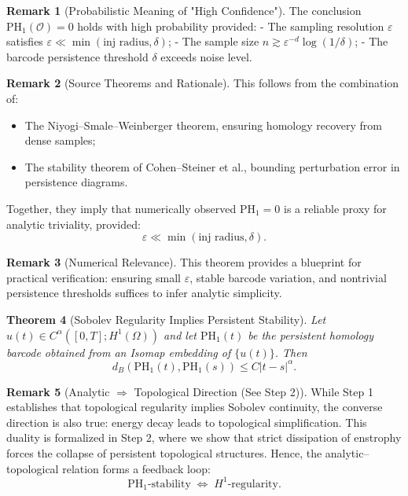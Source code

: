 \documentclass[11pt]{article}
\newtheorem{theorem}{Theorem}[section]
\theoremstyle{definition}
\newtheorem{remark}[theorem]{Remark}
\begin{document}
\begin{remark}[Probabilistic Meaning of "High Confidence"]
The conclusion $\mathrm{PH}_1(\mathcal{O}) = 0$ holds with high probability provided:
- The sampling resolution $\varepsilon$ satisfies $\varepsilon \ll \min(\text{inj radius}, \delta)$;
- The sample size $n \gtrsim \varepsilon^{-d} \log(1/\delta)$;
- The barcode persistence threshold $\delta$ exceeds noise level.
\end{remark}

\begin{remark}[Source Theorems and Rationale]
This follows from the combination of:
\begin{itemize}
    \item The Niyogi–Smale–Weinberger theorem, ensuring homology recovery from dense samples;
    \item The stability theorem of Cohen–Steiner et al., bounding perturbation error in persistence diagrams.
\end{itemize}
Together, they imply that numerically observed $\mathrm{PH}_1 = 0$ is a reliable proxy for analytic triviality, provided:
\[
\varepsilon \ll \min(\text{inj radius}, \delta).
\]
\end{remark}

\begin{remark}[Numerical Relevance]
This theorem provides a blueprint for practical verification: ensuring small $\varepsilon$, stable barcode variation, and nontrivial persistence thresholds suffices to infer analytic simplicity.
\end{remark}

\begin{theorem}[Sobolev Regularity Implies Persistent Stability]
Let $u(t) \in C^\alpha([0,T]; H^1(\Omega))$ and let $\mathrm{PH}_1(t)$ be the persistent homology barcode obtained from an Isomap embedding of $\{u(t)\}$. Then
\[
d_B(\mathrm{PH}_1(t), \mathrm{PH}_1(s)) \leq C |t - s|^\alpha.
\]
\end{theorem}

\begin{remark}[Analytic $\Rightarrow$ Topological Direction (See Step 2)]
While Step 1 establishes that topological regularity implies Sobolev continuity, the converse direction is also true: energy decay leads to topological simplification. This duality is formalized in Step 2, where we show that strict dissipation of enstrophy forces the collapse of persistent topological structures. Hence, the analytic–topological relation forms a feedback loop:
\[
\mathrm{PH}_1\text{-stability} \;\Longleftrightarrow\; H^1\text{-regularity}.
\]
\end{remark}
\end{document}
